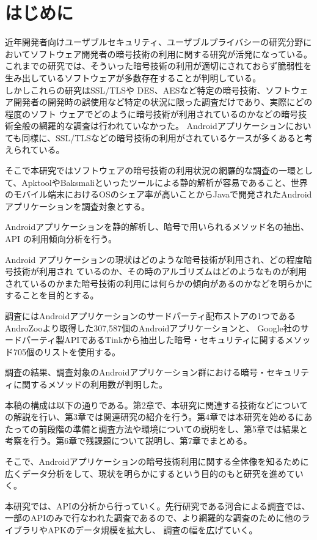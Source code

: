 \newpage
\section{はじめに} 
近年開発者向けユーザブルセキュリティ、ユーザブルプライバシーの研究分野においてソフトウェア開発者の暗号技術の利用に関する研究が活発になっている。
これまでの研究では、そういった暗号技術の利用が適切にされておらず脆弱性を生み出しているソフトウェアが多数存在することが判明している。
\\しかしこれらの研究はSSL/TLSや DES、AESなど特定の暗号技術、ソフトウェア開発者の開発時の誤使用など特定の状況に限った調査だけであり、実際にどの程度のソフト
ウェアでどのように暗号技術が利用されているのかなどの暗号技術全般の網羅的な調査は行われていなかった。
Androidアプリケーションにおいても同様に、SSL/TLSなどの暗号技術の利用がされているケースが多くあると考えられている。

そこで本研究ではソフトウェアの暗号技術の利用状況の網羅的な調査の一環として、ApktoolやBaksmaliといったツールによる静的解析が容易であること、世界のモバイル端末におけるOSのシェア率が高いこと\cite{share}からJavaで開発されたAndroidアプリケーションを調査対象とする。


Androidアプリケーションを静的解析し、暗号で用いられるメソッド名の抽出、API の利用傾向分析を行う。

Android アプリケーションの現状はどのような暗号技術が利用され、どの程度暗号技術が利用され
ているのか、その時のアルゴリズムはどのようなものが利用されているのかまた暗号技術の利用には何らかの傾向があるのかなどを明らかにすることを目的とする。


調査にはAndroidアプリケーションのサードパーティ配布ストアの1つであるAndroZooより取得した307,587個のAndroidアプリケーションと、
Google社のサードパーティ製APIであるTinkから抽出した暗号・セキュリティに関するメソッド705個のリストを使用する。



調査の結果、調査対象のAndroidアプリケーション群における暗号・セキュリティに関するメソッドの利用数が判明した。


本稿の構成は以下の通りである。第2章で、本研究に関連する技術などについての解説を行い、第3章では関連研究の紹介を行う。第4章では本研究を始めるにあたっての前段階の準備と調査方法や環境についての説明をし、第5章では結果と考察を行う。第6章で残課題について説明し、第7章でまとめる。



そこで、Androidアプリケーションの暗号技術利用に関する全体像を知るために広くデータ分析をして、現状を明らかにするという目的のもと研究を進めていく。


本研究では、APIの分析から行っていく。先行研究である河合による調査では、一部のAPIのみで行なわれた調査であるので、より網羅的な調査のために他のライブラリやAPKのデータ規模を拡大し、
調査の幅を広げていく。
\fi